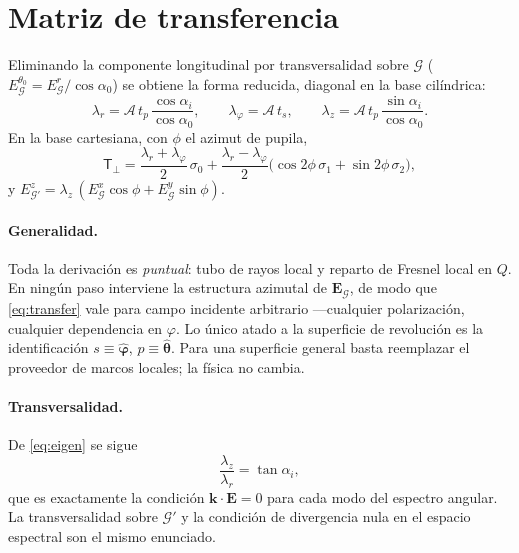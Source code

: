 \documentclass[11pt,a4paper]{article}
\newcommand{\phihat}{\hat{\boldsymbol{\varphi}}}
\newcommand{\thhat}{\hat{\boldsymbol{\theta}}}
\newcommand{\E}{\mathbf{E}}
\begin{document}
\section{Matriz de transferencia}

Eliminando la componente longitudinal por transversalidad sobre $\mathcal{G}$
($E_{\mathcal{G}}^{\theta_0}=E_{\mathcal{G}}^{r}/\cos\alpha_0$) se obtiene la
forma reducida, diagonal en la base cilíndrica:
\begin{equation}
  \lambda_r=\mathcal{A}\,t_p\,\frac{\cos\alpha_i}{\cos\alpha_0},\qquad
  \lambda_\varphi=\mathcal{A}\,t_s,\qquad
  \lambda_z=\mathcal{A}\,t_p\,\frac{\sin\alpha_i}{\cos\alpha_0}.
  \label{eq:eigen}
\end{equation}
En la base cartesiana, con $\phi$ el azimut de pupila,
\begin{equation}
  \mathsf{T}_\perp=
  \frac{\lambda_r+\lambda_\varphi}{2}\,\sigma_0
  +\frac{\lambda_r-\lambda_\varphi}{2}
  \bigl(\cos2\phi\,\sigma_1+\sin2\phi\,\sigma_2\bigr),
  \label{eq:cartesian}
\end{equation}
y $E_{\mathcal{G}'}^{z}=\lambda_z\,(E_{\mathcal{G}}^{x}\cos\phi+E_{\mathcal{G}}^{y}\sin\phi)$.

\paragraph{Generalidad.} Toda la derivación es \emph{puntual}: tubo de rayos
local y reparto de Fresnel local en $Q$. En ningún paso interviene la
estructura azimutal de $\E_{\mathcal{G}}$, de modo que \eqref{eq:transfer} vale
para campo incidente arbitrario ---cualquier polarización, cualquier
dependencia en $\varphi$. Lo único atado a la superficie de revolución es la
identificación $s\equiv\phihat$, $p\equiv\thhat$. Para una superficie general
basta reemplazar el proveedor de marcos locales; la física no cambia.

\paragraph{Transversalidad.} De \eqref{eq:eigen} se sigue
\begin{equation}
  \frac{\lambda_z}{\lambda_r}=\tan\alpha_i ,
  \label{eq:transversality}
\end{equation}
que es exactamente la condición $\mathbf{k}\cdot\E=0$ para cada modo del
espectro angular. La transversalidad sobre $\mathcal{G}'$ y la condición de
divergencia nula en el espacio espectral son el mismo enunciado.
\end{document}
